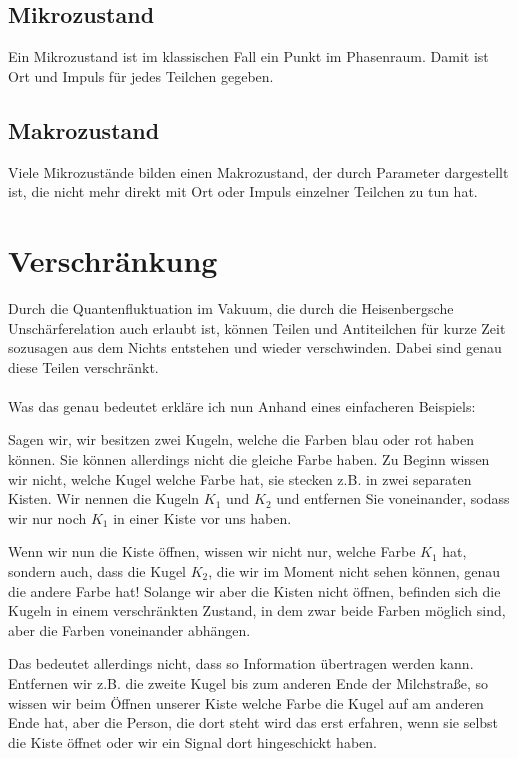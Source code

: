 \documentclass[ngerman]{scrartcl}
\begin{document}
\subsection*{Mikrozustand}
Ein Mikrozustand ist im klassischen Fall ein Punkt im Phasenraum. Damit ist Ort und Impuls für jedes Teilchen gegeben.

\subsection*{Makrozustand}
Viele Mikrozustände bilden einen Makrozustand, der durch Parameter dargestellt ist, die nicht mehr direkt mit Ort oder Impuls einzelner Teilchen zu tun hat.

\section{Verschränkung} \label{Verschränkung}
	Durch die Quantenfluktuation im Vakuum, die durch die Heisenbergsche Unschärferelation auch erlaubt ist, können Teilen und Antiteilchen für kurze Zeit sozusagen aus dem Nichts entstehen und wieder verschwinden. Dabei sind genau diese Teilen verschränkt.
	\\ \\
	Was das genau bedeutet erkläre ich nun Anhand eines einfacheren Beispiels:
	
	Sagen wir, wir besitzen zwei Kugeln, welche die Farben blau oder rot haben können. Sie können allerdings nicht die gleiche Farbe haben. 
	Zu Beginn wissen wir nicht, welche Kugel welche Farbe hat, sie stecken z.B. in zwei separaten Kisten. Wir nennen die Kugeln $K_1$ und $K_2$ und entfernen Sie voneinander, sodass wir nur noch $K_1$ in einer Kiste vor uns haben. 
	
	Wenn wir nun die Kiste öffnen, wissen wir nicht nur, welche Farbe $K_1$ hat, sondern auch, dass die Kugel $K_2$, die wir im Moment nicht sehen können, genau die andere Farbe hat! 
	Solange wir aber die Kisten nicht öffnen, befinden sich die Kugeln in einem verschränkten Zustand, in dem zwar beide Farben möglich sind, aber die Farben voneinander abhängen. 
	
	Das bedeutet allerdings nicht, dass so Information übertragen werden kann. Entfernen wir z.B. die zweite Kugel bis zum anderen Ende der Milchstraße, so wissen wir beim Öffnen unserer Kiste welche Farbe die Kugel auf am anderen Ende hat, aber die Person, die dort steht wird das erst erfahren, wenn sie selbst die Kiste öffnet oder wir ein Signal dort hingeschickt haben.
\end{document}
